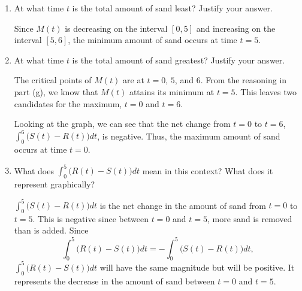 \documentclass[main]{subfiles}
\begin{document}
\begin{enumerate}
\begin{enumerate}[resume,topsep=0pt]
    
    \end{enumerate}
        \probonly{\end{minipage}}
    \begin{enumerate}[start=7]
    \item \begin{problem}[\vfill] 
    At what time $t$ is the total
    amount of sand least? Justify your answer.
    \end{problem}

    \begin{solution}
        Since $M(t)$ is decreasing on the interval $[0,5]$ and
        increasing on the interval $[5,6]$, the minimum amount of
        sand occurs at time $\boxed{t=5.}$
    \end{solution}

    \item \begin{problem}[\vfill]
    At what time $t$ is the total
    amount of sand greatest? Justify your answer.
    \end{problem}
    
    \begin{solution}
        The critical points of $M(t)$ are at $t=0$, $5$, and $6$.
        From the reasoning in part (g), we know that $M(t)$ 
        attains its minimum at $t=5$. This leaves two candidates for
        the maximum, $t=0$ and $t=6$. 
        
        Looking at the graph, we can
        see that the net change from $t=0$ to $t=6$, 
        $\displaystyle\int_0^6 \bigl(S(t)-R(t)\bigr)dt$, 
        is negative. Thus, the maximum amount of sand occurs
        at time $\boxed{t=0.}$
    \end{solution}

    
    \item \begin{problem}[\vfill]
    What does $\displaystyle\int_0^5 \bigl(R(t)-S(t)\bigr)dt$
    mean in this context? What does it represent graphically?
    \end{problem}

    \begin{solution}
        $\displaystyle\int_0^5\bigl(S(t)-R(t)\bigr)dt$ is the
        net change in the amount of sand from $t=0$ to $t=5$. This
        is negative since between $t=0$ and $t=5$, more sand 
        is removed than is added. Since
        \[\int_0^5 \bigl(R(t)-S(t)\bigr)dt 
        = -\int_0^5 \bigl(S(t)-R(t)\bigr)dt,\]
        $\displaystyle\int_0^5 \bigl(R(t)-S(t)\bigr)dt$
        will have the same magnitude but will be positive. It 
        represents the decrease in the amount of sand between $t=0$
        and $t=5$.


\end{solution}
\end{enumerate}
\end{enumerate}
\end{document}

